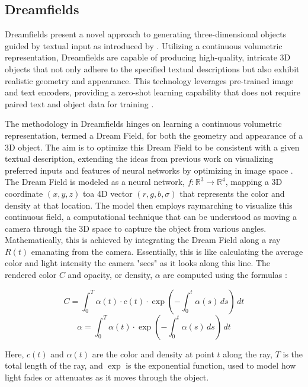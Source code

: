 \subsection{Dreamfields}
\label{dreamfields}

Dreamfields present a novel approach to generating three-dimensional objects guided by textual input as introduced by \citeauthor{jainDreamFields}. Utilizing a continuous volumetric representation, Dreamfields are capable of producing high-quality, intricate 3D objects that not only adhere to the specified textual descriptions but also exhibit realistic geometry and appearance. This technology leverages pre-trained image and text encoders, providing a zero-shot learning capability that does not require paired text and object data for training \citep{jainDreamFields}.

The methodology in Dreamfields hinges on learning a continuous volumetric representation, termed a Dream Field, for both the geometry and appearance of a 3D object. The aim is to optimize this Dream Field to be consistent with a given textual description, extending the ideas from previous work on visualizing preferred inputs and features of neural networks by optimizing in image space \citep{jainDreamFields}. The Dream Field is modeled as a neural network, \( f: \mathbb{R}^3 \rightarrow \mathbb{R}^4 \), mapping a 3D coordinate \( (x, y, z) \) toa 4D vector \( (r, g, b, \sigma) \) that represents the color and density at that location. The model then employs raymarching to visualize this continuous field, a computational technique that can be understood as moving a camera through the 3D space to capture the object from various angles. Mathematically, this is achieved by integrating the Dream Field along a ray \( R(t) \) emanating from the camera. Essentially, this is like calculating the average color and light intensity the camera "sees" as it looks along this line. The rendered color \( C \) and opacity, or density, \( \alpha \) are computed using the formulas \citep{jainDreamFields}:

\[
C = \int_0^T \alpha(t) \cdot c(t) \cdot \exp\left(-\int_0^t \alpha(s) \, ds\right) \, dt
\]
\[
\alpha = \int_0^T \alpha(t) \cdot \exp\left(-\int_0^t \alpha(s) \, ds\right) \, dt
\]

Here, \( c(t) \) and \( \alpha(t) \) are the color and density at point \( t \) along the ray, \( T \) is the total length of the ray, and \( \exp \) is the exponential function, used to model how light fades or attenuates as it moves through the object. 

